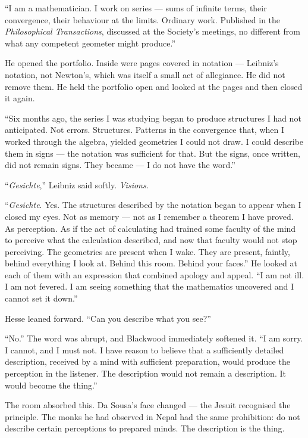 ``I am a mathematician. I work on series --- sums of infinite terms, their convergence, their behaviour at the limits. Ordinary work. Published in the \emph{Philosophical Transactions}, discussed at the Society's meetings, no different from what any competent geometer might produce.''

He opened the portfolio. Inside were pages covered in notation --- Leibniz's notation, not Newton's, which was itself a small act of allegiance. He did not remove them. He held the portfolio open and looked at the pages and then closed it again.

``Six months ago, the series I was studying began to produce structures I had not anticipated. Not errors. Structures. Patterns in the convergence that, when I worked through the algebra, yielded geometries I could not draw. I could describe them in signs --- the notation was sufficient for that. But the signs, once written, did not remain signs. They became --- I do not have the word.''

``\emph{Gesichte},'' Leibniz said softly. \emph{Visions.}

``\emph{Gesichte}. Yes. The structures described by the notation began to appear when I closed my eyes. Not as memory --- not as I remember a theorem I have proved. As perception. As if the act of calculating had trained some faculty of the mind to perceive what the calculation described, and now that faculty would not stop perceiving. The geometries are present when I wake. They are present, faintly, behind everything I look at. Behind this room. Behind your faces.'' He looked at each of them with an expression that combined apology and appeal. ``I am not ill. I am not fevered. I am seeing something that the mathematics uncovered and I cannot set it down.''

Hesse leaned forward. ``Can you describe what you see?''

``No.'' The word was abrupt, and Blackwood immediately softened it. ``I am sorry. I cannot, and I must not. I have reason to believe that a sufficiently detailed description, received by a mind with sufficient preparation, would produce the perception in the listener. The description would not remain a description. It would become the thing.''

The room absorbed this. Da Sousa's face changed --- the Jesuit recognised the principle. The monks he had observed in Nepal had the same prohibition: do not describe certain perceptions to prepared minds. The description is the thing.

